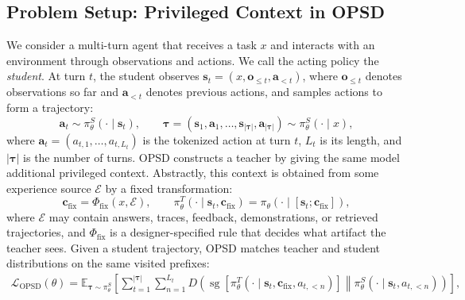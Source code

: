 \documentclass{article} %
\begin{document}
\subsection{Problem Setup: Privileged Context in OPSD}
\vspace{-0.6em}
We consider a multi-turn agent that receives a task $x$ and interacts with an environment through observations and actions. We call the acting policy the \emph{student}. At turn $t$, the student observes $\boldsymbol{s}_t=(x,\boldsymbol{o}_{\le t},\boldsymbol{a}_{<t})$, where $\boldsymbol{o}_{\le t}$ denotes observations so far and $\boldsymbol{a}_{<t}$ denotes previous actions, and samples actions to form a trajectory:
\begin{equation}
\boldsymbol{a}_t \sim \pi_\theta^{S}(\cdot\mid \boldsymbol{s}_t),\qquad
\boldsymbol{\tau}=(\boldsymbol{s}_1,\boldsymbol{a}_1,\ldots,\boldsymbol{s}_{|\boldsymbol{\tau}|},\boldsymbol{a}_{|\boldsymbol{\tau}|})\sim \pi_\theta^{S}(\cdot\mid x),
\label{eq:student-agent-rollout}
\end{equation}
where $\boldsymbol{a}_t=(a_{t,1},\ldots,a_{t,L_t})$ is the tokenized action at turn $t$, $L_t$ is its length, and $|\boldsymbol{\tau}|$ is the number of turns.
OPSD constructs a teacher by giving the same model additional privileged context. Abstractly, this context is obtained from some experience source $\mathcal{E}$ by a fixed transformation:
\begin{equation}
\boldsymbol{c}_{\mathrm{fix}}=\Phi_{\mathrm{fix}}(x,\mathcal{E}),\qquad
\pi_\theta^{T}(\cdot\mid \boldsymbol{s}_t,\boldsymbol{c}_{\mathrm{fix}})=\pi_\theta(\cdot\mid [\boldsymbol{s}_t;\boldsymbol{c}_{\mathrm{fix}}]),
\label{eq:fixed-privileged-context}
\end{equation}
where $\mathcal{E}$ may contain answers, traces, feedback, demonstrations, or retrieved trajectories, and $\Phi_{\mathrm{fix}}$ is a designer-specified rule that decides what artifact the teacher sees. Given a student trajectory, OPSD matches teacher and student distributions on the same visited prefixes:
\begin{equation}
\begin{aligned}
\mathcal{L}_{\mathrm{OPSD}}(\theta)
=
\mathbb{E}_{\boldsymbol{\tau}\sim\pi_\theta^{S}}
\left[
\sum_{t=1}^{|\boldsymbol{\tau}|}\sum_{n=1}^{L_t}
D\!\left(
\operatorname{sg}\!\left[\pi_\theta^{T}(\cdot\mid \boldsymbol{s}_t,\boldsymbol{c}_{\mathrm{fix}},a_{t,<n})\right]
\middle\|
\pi_\theta^{S}(\cdot\mid \boldsymbol{s}_t,a_{t,<n})
\right)
\right],
\end{aligned}
\label{eq:generic-opsd}
\end{equation}
\end{document}
